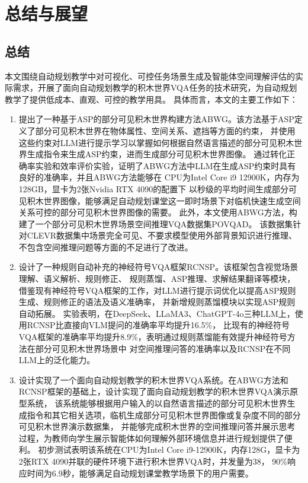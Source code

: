 \chapter{总结与展望}
\section{总结}
本文围绕自动规划教学中对可视化、可控任务场景生成及智能体空间理解评估的实际需求，开展了面向自动规划教学的积木世界VQA任务的技术研究，为自动规划教学了提供低成本、直观、可控的教学用具。
具体而言，本文的主要工作如下：
\begin{enumerate}[nosep]
\item 提出了一种基于ASP的部分可见积木世界构建方法ABWG。该方法基于ASP定义了部分可见积木世界在物体属性、空间关系、遮挡等方面的约束，
并使用这些约束对LLM进行提示学习以掌握如何根据自然语言描述的部分可见积木世界生成指令来生成ASP约束，进而生成部分可见积木世界图像。
通过转化正确率实验和效率评价实验，证明了ABWG方法中LLM在生成ASP约束时具有良好的准确率，并且ABWG方法能够在
CPU为Intel Core i9 12900K，内存为128GB，显卡为2张Nvidia RTX 4090的配置下
以秒级的平均时间生成部分可见积木世界图像，能够满足自动规划课堂这一即时场景下对临机快速生成空间关系可控的部分可见积木世界图像的需要。
此外，本文使用ABWG方法，构建了一个部分可见积木世界场景空间推理VQA数据集POVQAD。
该数据集针对CLEVR数据集中场景完全可见、不要求模型使用外部背景知识进行推理、不包含空间推理问题等方面的不足进行了改进。
\item 设计了一种规则自动补充的神经符号VQA框架RCNSP。该框架包含视觉场景理解、语义解析、规则修正、
规则蒸馏、ASP推理、求解结果翻译等模块，借鉴现有神经符号VQA框架的工作，对LLM进行提示词优化以提高ASP规则生成、规则修正的语法及语义准确率，
并新增规则蒸馏模块以实现ASP规则自动拓展。
实验表明，在DeepSeek、LLaMA3、ChatGPT-4o三种LLM上，使用RCNSP比直接向VLM提问的准确率平均提升16.5\%，
比现有的神经符号VQA框架的准确率平均提升8.9\%，表明通过规则蒸馏能有效提升神经符号方法在部分可见积木世界场景中
对空间推理问答的准确率以及RCNSP在不同LLM上的泛化能力。
\item 设计实现了一个面向自动规划教学的积木世界VQA系统。在ABWG方法和RCNSP框架的基础上，设计实现了面向自动规划教学的积木世界VQA演示原型系统，
该系统能够根据用户输入的以自然语言描述的部分可见积木世界生成指令和其它相关选项，临机生成部分可见积木世界图像或复杂度不同的部分可见积木世界演示数据集，
并能够完成积木世界的空间推理问答并展示思考过程，为教师向学生展示智能体如何理解外部环境信息并进行规划提供了便利。
初步测试表明该系统在CPU为Intel Core i9-12900K，内存128G，显卡为2张RTX 4090并联的硬件环境下进行积木世界VQA时，并发量为38，
90\%响应时间为6.9秒，能够满足自动规划课堂教学场景下的用户需要。
\end{enumerate}
